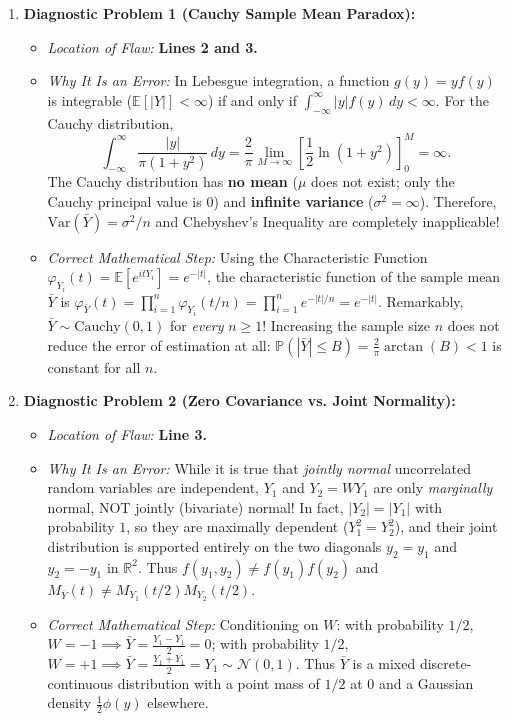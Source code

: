 \documentclass[11pt, letterpaper]{article}
\theoremstyle{definition}
\theoremstyle{remark}
\newcommand{\R}{\mathbb{R}}
\newcommand{\E}{\mathbb{E}}
\newcommand{\Prob}{\mathbb{P}}
\begin{document}
\begin{enumerate}[label=\textbf{Resolution \arabic*:}]
    \item \textbf{Diagnostic Problem 1 (Cauchy Sample Mean Paradox):}
    \begin{itemize}
        \item \emph{Location of Flaw:} \textbf{Lines 2 and 3.}
        \item \emph{Why It Is an Error:} In Lebesgue integration, a function $g(y) = y f(y)$ is integrable ($\E[|Y|] < \infty$) if and only if $\int_{-\infty}^{\infty} |y| f(y) \, dy < \infty$. For the Cauchy distribution,
        \[
            \int_{-\infty}^{\infty} \frac{|y|}{\pi(1 + y^2)} \, dy = \frac{2}{\pi} \lim_{M \to \infty} \left[ \frac{1}{2} \ln(1 + y^2) \right]_{0}^{M} = \infty.
        \]
        The Cauchy distribution has \textbf{no mean} ($\mu$ does not exist; only the Cauchy principal value is $0$) and \textbf{infinite variance} ($\sigma^2 = \infty$). Therefore, $\text{Var}(\bar{Y}) = \sigma^2/n$ and Chebyshev's Inequality are completely inapplicable!
        \item \emph{Correct Mathematical Step:} Using the Characteristic Function $\varphi_{Y_i}(t) = \E[e^{itY_i}] = e^{-|t|}$, the characteristic function of the sample mean $\bar{Y}$ is $\varphi_{\bar{Y}}(t) = \prod_{i=1}^n \varphi_{Y_i}(t/n) = \prod_{i=1}^n e^{-|t|/n} = e^{-|t|}$. Remarkably, $\bar{Y} \sim \text{Cauchy}(0, 1)$ for \emph{every} $n \ge 1$! Increasing the sample size $n$ does not reduce the error of estimation at all: $\Prob(|\bar{Y}| \le B) = \frac{2}{\pi}\arctan(B) < 1$ is constant for all $n$.
    \end{itemize}

    \item \textbf{Diagnostic Problem 2 (Zero Covariance vs. Joint Normality):}
    \begin{itemize}
        \item \emph{Location of Flaw:} \textbf{Line 3.}
        \item \emph{Why It Is an Error:} While it is true that \emph{jointly normal} uncorrelated random variables are independent, $Y_1$ and $Y_2 = W Y_1$ are only \emph{marginally} normal, NOT jointly (bivariate) normal! In fact, $|Y_2| = |Y_1|$ with probability $1$, so they are maximally dependent ($Y_1^2 = Y_2^2$), and their joint distribution is supported entirely on the two diagonals $y_2 = y_1$ and $y_2 = -y_1$ in $\R^2$. Thus $f(y_1, y_2) \neq f(y_1)f(y_2)$ and $M_{\bar{Y}}(t) \neq M_{Y_1}(t/2)M_{Y_2}(t/2)$.
        \item \emph{Correct Mathematical Step:} Conditioning on $W$: with probability $1/2$, $W = -1 \implies \bar{Y} = \frac{Y_1 - Y_1}{2} = 0$; with probability $1/2$, $W = +1 \implies \bar{Y} = \frac{Y_1 + Y_1}{2} = Y_1 \sim \mathcal{N}(0, 1)$. Thus $\bar{Y}$ is a mixed discrete-continuous distribution with a point mass of $1/2$ at $0$ and a Gaussian density $\frac{1}{2}\phi(y)$ elsewhere.
    \end{itemize}


\end{enumerate}
\end{document}
